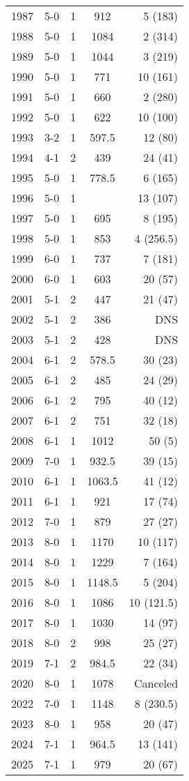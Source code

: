 \begin{longtable}{lcccr}
        1987 & 5-0 & 1 & 912 & 5 (183) \\
        1988 & 5-0 & 1 & 1084 & 2 (314) \\
        1989 & 5-0 & 1 & 1044 & 3 (219) \\
        1990 & 5-0 & 1 & 771 & 10 (161) \\
        1991 & 5-0 & 1 & 660 & 2 (280) \\
        1992 & 5-0 & 1 & 622 & 10 (100) \\
        1993 & 3-2 & 1 & 597.5 & 12 (80) \\
        1994 & 4-1 & 2 & 439 & 24 (41) \\
        1995 & 5-0 & 1 & 778.5 & 6 (165) \\
        1996 & 5-0 & 1 &   & 13 (107) \\
        1997 & 5-0 & 1 & 695 & 8 (195) \\
        1998 & 5-0 & 1 & 853 & 4 (256.5) \\
        1999 & 6-0 & 1 & 737 & 7 (181) \\
        2000 & 6-0 & 1 & 603 & 20 (57) \\
        2001 & 5-1 & 2 & 447 & 21 (47) \\
        2002 & 5-1 & 2 & 386 & DNS \\
        2003 & 5-1 & 2 & 428 & DNS \\
        2004 & 6-1 & 2 & 578.5 & 30 (23) \\
        2005 & 6-1 & 2 & 485 & 24 (29) \\
        2006 & 6-1 & 2 & 795 & 40 (12) \\
        2007 & 6-1 & 2 & 751 & 32 (18) \\
        2008 & 6-1 & 1 & 1012 & 50 (5) \\
        2009 & 7-0 & 1 & 932.5 & 39 (15) \\
        2010 & 6-1 & 1 & 1063.5 & 41 (12) \\
        2011 & 6-1 & 1 & 921 & 17 (74) \\
        2012 & 7-0 & 1 & 879 & 27 (27) \\
        2013 & 8-0 & 1 & 1170 & 10 (117) \\
        2014 & 8-0 & 1 & 1229 & 7 (164) \\
        2015 & 8-0 & 1 & 1148.5 & 5 (204) \\
        2016 & 8-0 & 1 & 1086 & 10 (121.5) \\
        2017 & 8-0 & 1 & 1030 & 14 (97) \\
        2018 & 8-0 & 2 & 998 & 25 (27) \\
        2019 & 7-1 & 2 & 984.5 & 22 (34) \\
        2020 & 8-0 & 1 & 1078 & Canceled \\
        2022 & 7-0 & 1 & 1148 & 8 (230.5) \\
        2023 & 8-0 & 1 & 958 & 20 (47) \\
        2024 & 7-1 & 1 & 964.5 & 13 (141) \\
        2025 & 7-1 & 1 & 979 & 20 (67) \\
        \bottomrule
        \end{longtable}
        
